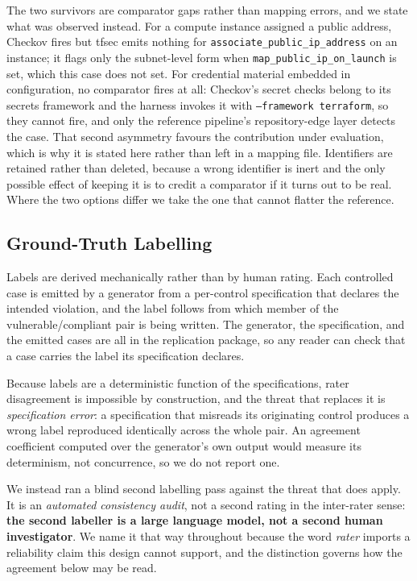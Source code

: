 \documentclass[smallextended]{svjour3}
\begin{document}
The two survivors are comparator gaps rather than mapping errors, and we state what
was observed instead. For a compute instance assigned a public address, Checkov
fires but tfsec emits nothing for \texttt{associate\_public\_ip\_address} on an
instance; it flags only the subnet-level form when
\texttt{map\_public\_ip\_on\_launch} is set, which this case does not set. For
credential material embedded in configuration, no comparator fires at all: Checkov's
secret checks belong to its secrets framework and the harness invokes it with
\texttt{--framework terraform}, so they cannot fire, and only the reference
pipeline's repository-edge layer detects the case. That second asymmetry favours
the contribution under evaluation, which is why it is stated here rather than left
in a mapping file. Identifiers are retained rather than deleted, because a wrong
identifier is inert and the only possible effect of keeping it is to credit a
comparator if it turns out to be real. Where the two options differ we take the one
that cannot flatter the reference.

\subsection{Ground-Truth Labelling}
\label{sec:labelling}
Labels are derived mechanically rather than by human rating. Each controlled case
is emitted by a generator from a per-control specification that declares the
intended violation, and the label follows from which member of the
vulnerable/compliant pair is being written. The generator, the specification, and
the emitted cases are all in the replication package, so any reader can check
that a case carries the label its specification declares.

Because labels are a deterministic function of the specifications, rater
disagreement is impossible by construction, and the threat that replaces it is
\emph{specification error}: a specification that misreads its originating control
produces a wrong label reproduced identically across the whole pair. An agreement
coefficient computed over the generator's own output would measure its
determinism, not concurrence, so we do not report one.

We instead ran a blind second labelling pass against the threat that does apply.
It is an \emph{automated consistency audit}, not a second rating in the
inter-rater sense: \textbf{the second labeller is a large language model, not a
second human investigator}. We name it that way throughout because the word
\emph{rater} imports a reliability claim this design cannot support, and the
distinction governs how the agreement below may be read.
\end{document}
